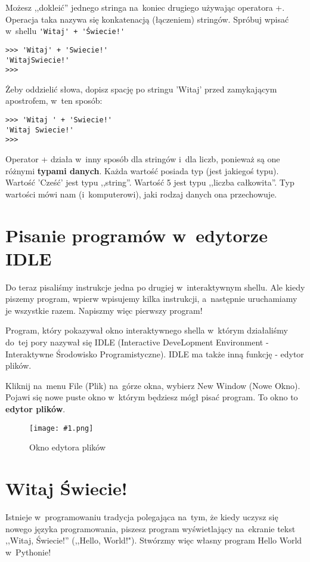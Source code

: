 \documentclass{book}
\newcommand{\img}[3]{
\begin{figure}
\centerline{
	\texttt{[image: \#1.png]}
}
\caption{#2}
\label{#1}
\end{figure}
}
\begin{document}
Możesz ,,dokleić'' jednego stringa na~koniec drugiego używając operatora +. Operacja taka nazywa się konkatenacją (łączeniem) stringów. Spróbuj wpisać w~shellu \lstinline{'Witaj' + 'Świecie!'}

\begin{lstlisting}
>>> 'Witaj' + 'Swiecie!'
'WitajSwiecie!'
>>>
\end{lstlisting}

Żeby oddzielić słowa, dopisz spację po stringu 'Witaj' przed zamykającym apostrofem, w~ten sposób:

\begin{lstlisting}
>>> 'Witaj ' + 'Swiecie!'
'Witaj Swiecie!'
>>> 
\end{lstlisting}

Operator + działa w~inny sposób dla stringów i~dla liczb, ponieważ są one różnymi {\bf typami danych}. Każda wartość posiada typ (jest jakiegoś typu). Wartość 'Cześć' jest typu ,,string''. Wartość 5 jest typu ,,liczba całkowita''. Typ wartości mówi nam (i~komputerowi), jaki rodzaj danych ona przechowuje. 

\section{Pisanie programów w~edytorze IDLE}

Do teraz pisaliśmy instrukcje jedna po drugiej w~interaktywnym shellu. Ale kiedy piszemy program, wpierw wpisujemy kilka instrukcji, a~następnie uruchamiamy je wszystkie razem. Napiszmy więc pierwszy program!

Program, który pokazywał okno interaktywnego shella w~którym działaliśmy do~tej pory nazywał się IDLE (Interactive DeveLopment Environment - Interaktywne Środowisko Programistyczne). IDLE ma także inną funkcję - edytor plików.

Kliknij na~menu File (Plik) na~górze okna, wybierz New Window (Nowe Okno). Pojawi się nowe puste okno w~którym będziesz mógł pisać program. To okno to {\bf edytor plików}.

\img{strings-fileeditor}{Okno edytora plików}{7 cm}

\section{Witaj Świecie!}

Istnieje w~programowaniu tradycja polegająca na~tym, że kiedy uczysz się nowego języka programowania, piszesz program wyświetlający na~ekranie tekst ,,Witaj, Świecie!'' (,,Hello, World!"). Stwórzmy więc własny program Hello World w~Pythonie!
\end{document}
